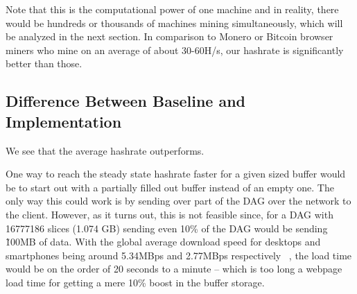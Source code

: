 \documentclass[runningheads]{llncs}
\begin{document}

Note that this is the computational power of one machine and in reality, there would be hundreds or thousands of machines mining simultaneously, which will be analyzed in the next section. In comparison to Monero or Bitcoin browser miners who mine on an average of about 30-60H/s, our hashrate is significantly better than those.

\subsection{Difference Between Baseline and Implementation}
We see that the average hashrate outperforms.

One way to reach the steady state hashrate faster for a given sized buffer would be to start out with a partially filled out buffer instead of an empty one. The only way this could work is by sending over part of the DAG over the network to the client. However, as it turns out, this is not feasible since, for a DAG with 16777186 slices (1.074 GB) sending even 10\% of the DAG would be sending \~100MB of data. With the global average download speed for desktops and smartphones being around 5.34MBps and 2.77MBps respectively ~\cite{http://www.speedtest.net/global-index}, the load time would be on the order of 20 seconds to a minute -- which is too long a webpage load time for getting a mere 10\% boost in the buffer storage. 
\end{document}
